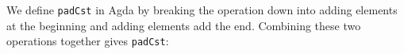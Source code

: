 \documentclass{l4proj}
\begin{document}
We define \texttt{padCst} in Agda by breaking the operation down into adding elements at the beginning and adding elements add the end. Combining these two operations together gives \texttt{padCst}:
\begin{code}%
\>[0]\<%
\\
\>[0]\AgdaSpace{}%
\AgdaSymbol{:}\AgdaSpace{}%
\AgdaSymbol{\{}\AgdaSpace{}%
\AgdaSymbol{:}\AgdaSpace{}%
\AgdaSymbol{\}}\AgdaSpace{}%
\AgdaSpace{}%
\AgdaSymbol{(}\AgdaSpace{}%
\AgdaSymbol{:}\AgdaSpace{}%
\AgdaSymbol{)}\AgdaSpace{}%
\AgdaSpace{}%
\AgdaSymbol{\{}\AgdaSpace{}%
\AgdaSymbol{:}\AgdaSpace{}%
\AgdaSymbol{\}}\AgdaSpace{}%
\AgdaSpace{}%
\AgdaSpace{}%
\AgdaSpace{}%
\AgdaSpace{}%
\AgdaSpace{}%
\AgdaSpace{}%
\AgdaSpace{}%
\AgdaSpace{}%
\AgdaSpace{}%
\AgdaSymbol{(}\AgdaSpace{}%
\AgdaOperator{\AgdaPrimitive{+}}\AgdaSpace{}%
\AgdaSymbol{)}\<%
\\
\>[0]\AgdaSpace{}%
\AgdaSpace{}%
\AgdaSpace{}%
\AgdaSpace{}%
\AgdaSymbol{=}\AgdaSpace{}%
\<%
\\
\>[0]\AgdaSpace{}%
\AgdaSymbol{(}\AgdaSpace{}%
\AgdaSymbol{)}\AgdaSpace{}%
\AgdaSpace{}%
\AgdaSpace{}%
\AgdaSymbol{=}\AgdaSpace{}%
\AgdaSpace{}%
\AgdaSpace{}%
\AgdaSpace{}%
\AgdaSymbol{(}\AgdaOperator{\AgdaFunction{[}}\AgdaSpace{}%
\AgdaSpace{}%
\AgdaOperator{\AgdaFunction{]}}\AgdaSpace{}%
\AgdaOperator{\AgdaFunction{++}}\AgdaSpace{}%
\AgdaSymbol{)}\<%
\\
%
\\[\AgdaEmptyExtraSkip]%
\>[0]\<%
\\
\>[0]\AgdaSpace{}%
\AgdaSymbol{:}\AgdaSpace{}%
\AgdaSymbol{\{}\AgdaSpace{}%
\AgdaSymbol{:}\AgdaSpace{}%
\AgdaSymbol{\}}\AgdaSpace{}%
\AgdaSpace{}%
\AgdaSymbol{(}\AgdaSpace{}%
\AgdaSymbol{:}\AgdaSpace{}%
\AgdaSymbol{)}\AgdaSpace{}%
\AgdaSpace{}%
\AgdaSymbol{\{}\AgdaSpace{}%
\AgdaSymbol{:}\AgdaSpace{}%

\end{code}
\end{document}
